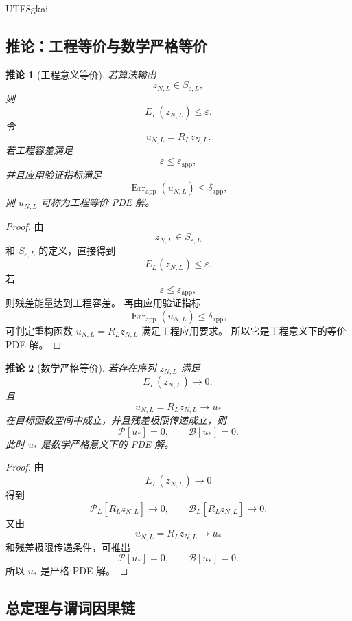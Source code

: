 \documentclass[12pt]{article}
\newtheorem{corollary}{推论}[section]
\begin{document}
\begin{CJK*}{UTF8}{gkai}
\subsection{推论：工程等价与数学严格等价}
\label{subsec:tex55-engineering-and-mathematical-equivalence}

\begin{corollary}[工程意义等价]
\label{cor:tex55-engineering-equivalent-pde-solution}
若算法输出
\[
  z_{N,L}\in S_{\varepsilon,L},
\]
则
\[
  E_L(z_{N,L})\le\varepsilon.
\]
令
\[
  u_{N,L}=R_Lz_{N,L}.
\]
若工程容差满足
\[
  \varepsilon\le\varepsilon_{\mathrm{app}},
\]
并且应用验证指标满足
\[
  \operatorname{Err}_{\mathrm{app}}(u_{N,L})
  \le
  \delta_{\mathrm{app}},
\]
则 \(u_{N,L}\) 可称为工程等价 PDE 解。
\end{corollary}

\begin{proof}
由
\[
  z_{N,L}\in S_{\varepsilon,L}
\]
和 \(S_{\varepsilon,L}\) 的定义，直接得到
\[
  E_L(z_{N,L})\le\varepsilon.
\]
若
\[
  \varepsilon\le\varepsilon_{\mathrm{app}},
\]
则残差能量达到工程容差。
再由应用验证指标
\[
  \operatorname{Err}_{\mathrm{app}}(u_{N,L})
  \le
  \delta_{\mathrm{app}},
\]
可判定重构函数 \(u_{N,L}=R_Lz_{N,L}\) 满足工程应用要求。
所以它是工程意义下的等价 PDE 解。
\end{proof}

\begin{corollary}[数学严格等价]
\label{cor:tex55-mathematical-equivalent-pde-solution}
若存在序列 \(z_{N,L}\) 满足
\[
  E_L(z_{N,L})\to0,
\]
且
\[
  u_{N,L}=R_Lz_{N,L}\to u_*
\]
在目标函数空间中成立，并且残差极限传递成立，则
\[
  \mathcal P[u_*]=0,
  \qquad
  \mathcal B[u_*]=0.
\]
此时 \(u_*\) 是数学严格意义下的 PDE 解。
\end{corollary}

\begin{proof}
由
\[
  E_L(z_{N,L})\to0
\]
得到
\[
  \mathcal P_L[R_Lz_{N,L}]\to0,
  \qquad
  \mathcal B_L[R_Lz_{N,L}]\to0.
\]
又由
\[
  u_{N,L}=R_Lz_{N,L}\to u_*
\]
和残差极限传递条件，可推出
\[
  \mathcal P[u_*]=0,
  \qquad
  \mathcal B[u_*]=0.
\]
所以 \(u_*\) 是严格 PDE 解。
\end{proof}

\subsection{总定理与谓词因果链}
\label{subsec:tex55-explicit-demotion-final-theorem}


\end{CJK*}
\end{document}
